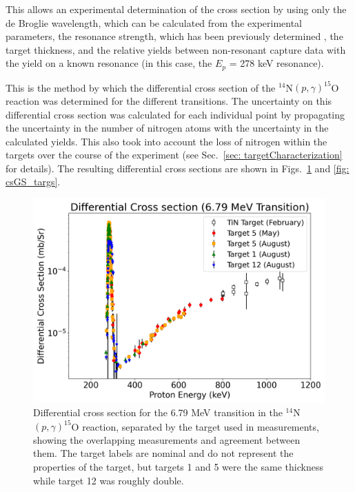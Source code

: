 \noindent This allows an experimental determination of the cross section by using only the de Broglie wavelength, which can be calculated from the experimental parameters, the resonance strength, which has been previously determined \cite{Imbriani2005, Daigle2016}, the target thickness, and the relative yields between non-resonant capture data with the yield on a known resonance (in this case, the $E_{p}$ = 278 keV resonance). 


This is the method by which the differential cross section of the $^{14}$N$\left( p,\gamma \right) ^{15}$O reaction was determined for the different transitions. The uncertainty on this differential cross section was calculated for each individual point by propagating the uncertainty in the number of nitrogen atoms with the uncertainty in the calculated yields. This also took into account the loss of nitrogen within the targets over the course of the experiment (see Sec.\ \ref{sec: targetCharacterization} for details). The resulting differential cross sections are shown in Figs.\ \ref{fig: cs679_targs} and \ref{fig: csGS_targs}. 



\begin{figure}
		\includegraphics[width=1.0\linewidth]{figures/cs679_targs.png}
	\caption{Differential cross section for the 6.79 MeV transition in the $^{14}$N$\left( p,\gamma \right) ^{15}$O reaction, separated by the target used in measurements, showing the overlapping measurements and agreement between them. The target labels are nominal and do not represent the properties of the target, but targets 1 and 5 were the same thickness while target 12 was roughly double.}
	\label{fig: cs679_targs}
\end{figure}

